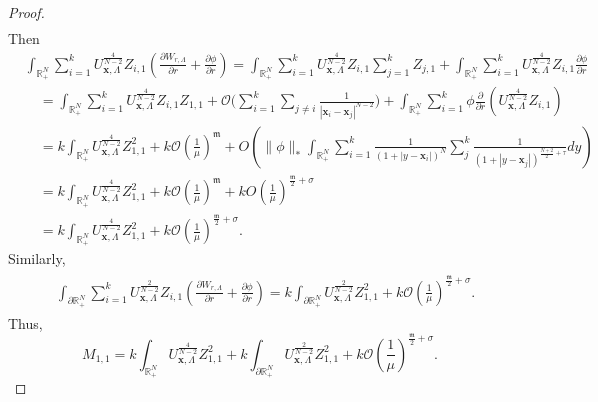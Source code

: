 \documentclass[11pt,a4paper]{amsart}
\begin{document}
\begin{proof}
\begin{align*}
  \end{align*}
  Then
$$
  \begin{aligned}
&\int_{\mathbb{R}_{+}^{N}}\sum_{i=1}^{k} U_{\mathbf{x},\Lambda}^{\frac{4}{N-2}} Z_{i,1}\left(\frac{\partial W_{r,\Lambda}}{\partial r}+\frac{\partial \phi}{\partial r}\right)=  \int_{\mathbb{R}_{+}^{N}}\sum_{i=1}^{k} U_{\mathbf{x},\Lambda}^{\frac{4}{N-2}} Z_{i,1}\sum_{j=1}^{k}Z_{j,1}+ \int_{\mathbb{R}_{+}^{N}}\sum_{i=1}^{k} U_{\mathbf{x},\Lambda}^{\frac{4}{N-2}} Z_{i,1}\frac{\partial \phi}{\partial r}\\
  &\quad = \int_{\mathbb{R}_{+}^{N}}\sum_{i=1}^{k} U_{\mathbf{x},\Lambda}^{\frac{4}{N-2}} Z_{i,1}Z_{1,1}+\mathcal O\Biggl(\sum_{i=1}^{k}\sum_{j\neq i} \frac{1}{|\mathbf{x}_i-\mathbf{x}_{j}|^{N-2}}\Biggr) + \int_{\mathbb{R}_{+}^{N}}\sum_{i=1}^{k}\phi \frac{\partial }{\partial r}\left(U_{\mathbf{x},\Lambda}^{\frac{4}{N-2}} Z_{i,1}\right)\\
  &\quad = k \int_{\mathbb{R}_{+}^{N}} U_{\mathbf{x},\Lambda}^{\frac{4}{N-2}} Z_{1,1}^2 + k \mathcal O\left(\frac{1}{\mu}\right)^{\mathfrak m} + O\left(\|\phi\|_{*}\int_{\mathbb{R}_{+}^{N}}\sum_{i=1}^{k}\frac{1}{(1+|y-\mathbf{x}_{i}|)^{N}}\sum_{j}^{k} \frac{1}{(1+|y-\mathbf{x}_{j}|)^{\frac{N+2}{2}+\tau}} d y\right)\\
  &\quad =  k \int_{\mathbb{R}_{+}^{N}} U_{\mathbf{x},\Lambda}^{\frac{4}{N-2}} Z_{1,1}^2+ k \mathcal O\left(\frac{1}{\mu}\right)^{\mathfrak m} + kO\left(\frac{1}{\mu}\right)^{\frac{\mathfrak m}{2}+\sigma} \\
  &\quad = k \int_{\mathbb{R}_{+}^{N}} U_{\mathbf{x},\Lambda}^{\frac{4}{N-2}} Z_{1,1}^2 + k\mathcal O\left(\frac{1}{\mu}\right)^{\frac{\mathfrak m}{2}+\sigma}.
  \end{aligned}
$$
Similarly,
\begin{align*}
  \begin{aligned}
    &\int_{\partial\mathbb{R}_{+}^{N}}\sum_{i=1}^{k} U_{\mathbf{x},\Lambda}^{\frac{2}{N-2}} Z_{i,1}\left(\frac{\partial W_{r,\Lambda}}{\partial r}+\frac{\partial \phi}{\partial r}\right)=   k \int_{\partial\mathbb{R}_{+}^{N}} U_{\mathbf{x},\Lambda}^{\frac{2}{N-2}} Z_{1,1}^2 + k\mathcal O\left(\frac{1}{\mu}\right)^{\frac{\mathfrak m}{2}+\sigma}.
\end{aligned}
\end{align*}
Thus, 
\[M_{1,1}= k \int_{\mathbb{R}_{+}^{N}} U_{\mathbf{x},\Lambda}^{\frac{4}{N-2}} Z_{1,1}^2 + k \int_{\partial\mathbb{R}_{+}^{N}} U_{\mathbf{x},\Lambda}^{\frac{2}{N-2}} Z_{1,1}^2 + k\mathcal O\left(\frac{1}{\mu}\right)^{\frac{\mathfrak m}{2}+\sigma}.\]

\end{proof}
\end{document}
